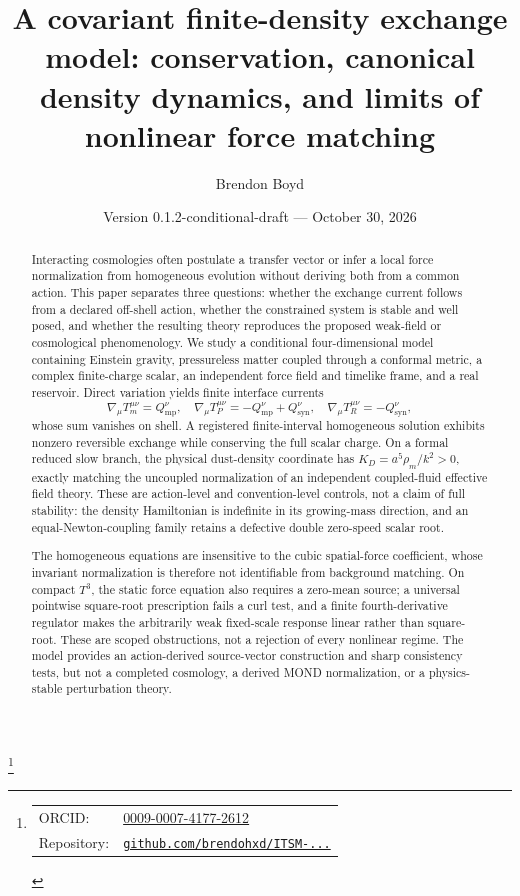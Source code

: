 \documentclass[aps,prd,reprint,superscriptaddress,nofootinbib,floatfix]{revtex4-2}
\newcommand{\Tthree}{T^{3}}
\newcommand{\Qmp}{Q_{\mathrm{mp}}}
\newcommand{\Qsyn}{Q_{\mathrm{syn}}}
\begin{document}
\title{A covariant finite-density exchange model: conservation, canonical
density dynamics, and limits of nonlinear force matching}

\author{Brendon Boyd}
\thanks{%
\begin{tabular}{@{}l@{\ }l@{}}
ORCID: & \href{https://orcid.org/0009-0007-4177-2612}{0009-0007-4177-2612} \\
Repository: & \href{https://github.com/brendohxd/ITSM-Integrated-Toroidal-Syntropic-Model}{\texttt{github.com/brendohxd/ITSM-...}} \\
\end{tabular}%
}

\date{Version 0.1.2-conditional-draft --- October 30, 2026}

\begin{abstract}
Interacting cosmologies often postulate a transfer vector or infer a local
force normalization from homogeneous evolution without deriving both from a
common action.  This paper separates three questions: whether the exchange
current follows from a declared off-shell action, whether the constrained
system is stable and well posed, and whether the resulting theory reproduces
the proposed weak-field or cosmological phenomenology.  We study a conditional
four-dimensional model containing Einstein gravity, pressureless matter
coupled through a conformal metric, a complex finite-charge scalar, an
independent force field and timelike frame, and a real reservoir.  Direct
variation yields finite interface currents
\[
 \nabla_\mu T_m^{\mu\nu}=\Qmp^\nu,\quad
 \nabla_\mu T_P^{\mu\nu}=-\Qmp^\nu+\Qsyn^\nu,\quad
 \nabla_\mu T_R^{\mu\nu}=-\Qsyn^\nu,
\]
whose sum vanishes on shell.  A registered finite-interval homogeneous
solution exhibits nonzero reversible exchange while conserving the full scalar
charge.  On a formal reduced slow branch, the physical dust-density coordinate
has
\(K_D=a^5\rho_m/k^2>0\), exactly matching the uncoupled normalization of an
independent coupled-fluid effective field theory.  These are action-level and
convention-level controls, not a claim of full stability: the density
Hamiltonian is indefinite in its growing-mass direction, and an
equal-Newton-coupling family retains a defective double zero-speed scalar
root.

The homogeneous equations are insensitive to the cubic spatial-force
coefficient, whose invariant normalization is therefore not identifiable from
background matching.  On compact \(\Tthree\), the static force equation also
requires a zero-mean source; a universal pointwise square-root prescription
fails a curl test, and a finite fourth-derivative regulator makes the
arbitrarily weak fixed-scale response linear rather than square-root.  These
are scoped obstructions, not a rejection of every nonlinear regime.  The
model provides an action-derived source-vector construction and sharp
consistency tests, but not a completed cosmology, a derived MOND
normalization, or a physics-stable perturbation theory.
\end{abstract}
\end{document}
